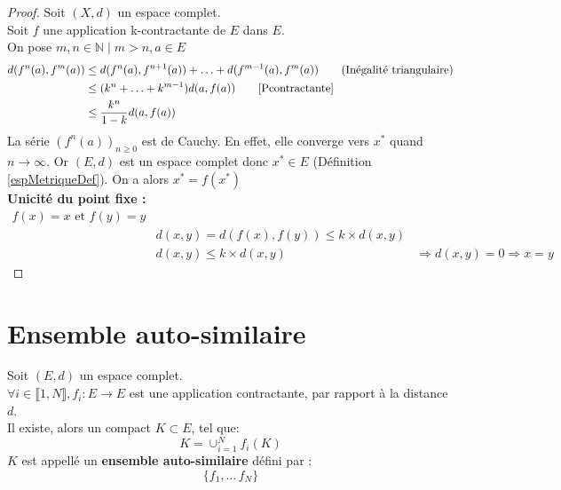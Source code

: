 \documentclass[a4paper, 12pt]{report}
\begin{document}
			\begin{proof}
				Soit $(X,d)$ un espace complet.\\
				Soit $f$ une application k-contractante de $E$ dans $E$.\\
				On pose $m,n\in\mathds{N}\mid m>n,a\in E$\\
				\begin{align*}
					d(f^n(a),f^m(a))&\leq d(f^n(a),f^{n+1}(a))+\ldots+d(f^{m-1}(a),f^m(a))  \tag{Inégalité triangulaire}\\
									&\leq (k^n+\ldots+k^{m-1})d(a,f(a)) \tag*{\eqref{Pcontractante}}\\
									&\leq \frac{k^n}{1-k}d(a,f(a))
				\end{align*}
				La série $(f^n(a))_{n\geq 0}$ est de Cauchy. En effet, elle converge vers $x^*$ quand $n\longrightarrow\infty$.
				Or $(E,d)$ est un espace complet donc $x^*\in E$ (Définition \ref{espMetriqueDef}).
				On a alors $x^*=f(x^*)$\\
				\textbf{Unicité du point fixe :}
				\begin{align*}
					f(x)=x \textrm{ et } f(y)=y\\
					&d(x,y) = d(f(x),f(y)) \leq k\times d(x,y)\\
					&d(x,y) \leq k\times d(x,y)
					&\Rightarrow d(x,y)=0\Rightarrow x=y \tag{Unicité}
				\end{align*}
			\end{proof}



		\section{Ensemble auto-similaire}
		
		\begin{theorem}
			Soit $(E,d)$ un espace complet.\\
			$\forall i \in \llbracket 1,N \rrbracket, f_i:E \longrightarrow E$ est une application contractante, par rapport à la distance $d$.\\
			Il existe, alors un compact $K\subset E$, tel que:
			\begin{equation*}
				K=\cup^N_{i=1}f_i(K)
			\end{equation*}
			$K$ est appellé un \textbf{ensemble auto-similaire} défini par :
			\begin{equation*}
				\{f_1,\ldots\,f_N\}
			\end{equation*}
		\end{theorem}
		
\end{document}
